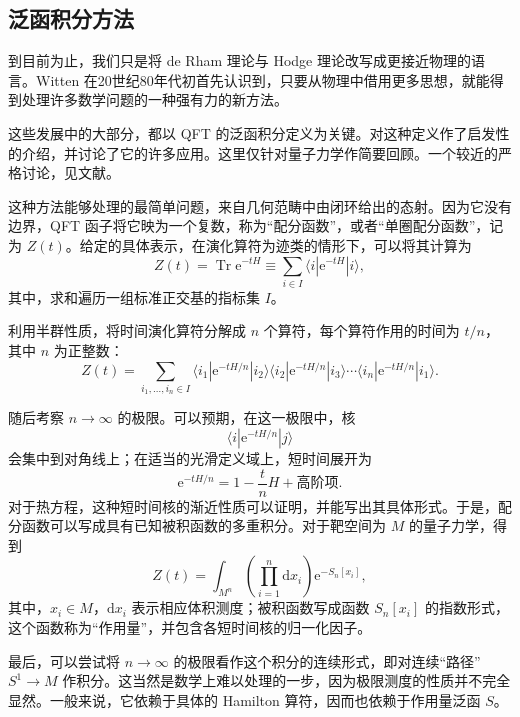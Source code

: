 \subsection{泛函积分方法}\label{sec:3.1.2}

到目前为止，我们只是将 de Rham 理论与 Hodge 理论改写成更接近物理的语言。Witten 在20世纪80年代初首先认识到，只要从物理中借用更多思想，就能得到处理许多数学问题的一种强有力的新方法。

这些发展中的大部分，都以 QFT 的泛函积分定义为关键。对这种定义作了启发性的介绍，并讨论了它的许多应用。这里仅针对量子力学作简要回顾。一个较近的严格讨论，见文献。

这种方法能够处理的最简单问题，来自几何范畴中由闭环给出的态射。因为它没有边界，QFT 函子将它映为一个复数，称为“配分函数”，或者“单圈配分函数”，记为 $Z(t)$。给定的具体表示，在演化算符为迹类的情形下，可以将其计算为
\begin{equation}\label{eq:3.12}
Z(t)=\operatorname{Tr}\mathrm{e}^{-tH}
\equiv\sum_{i\in I}\langle i|\mathrm{e}^{-tH}|i\rangle,
\end{equation}
其中，求和遍历一组标准正交基的指标集 $I$。

利用半群性质，将时间演化算符分解成 $n$ 个算符，每个算符作用的时间为 $t/n$，其中 $n$ 为正整数：
\[
Z(t)=\sum_{i_1,\ldots,i_n\in I}
\langle i_1|\mathrm{e}^{-tH/n}|i_2\rangle
\langle i_2|\mathrm{e}^{-tH/n}|i_3\rangle\cdots
\langle i_n|\mathrm{e}^{-tH/n}|i_1\rangle.
\]

随后考察 $n\to\infty$ 的极限。可以预期，在这一极限中，核
\[
\langle i|\mathrm{e}^{-tH/n}|j\rangle
\]
会集中到对角线上；在适当的光滑定义域上，短时间展开为
\[
\mathrm{e}^{-tH/n}=1-\frac{t}{n}H+\text{高阶项}.
\]
对于热方程，这种短时间核的渐近性质可以证明，并能写出其具体形式。于是，配分函数可以写成具有已知被积函数的多重积分。对于靶空间为 $M$ 的量子力学，得到
\begin{equation}\label{eq:3.13}
Z(t)=\int_{M^n}\left(\prod_{i=1}^n\mathrm{d}x_i\right)
\mathrm{e}^{-S_n[x_i]},
\end{equation}
其中，$x_i\in M$，$\mathrm{d}x_i$ 表示相应体积测度；被积函数写成函数 $S_n[x_i]$ 的指数形式，这个函数称为“作用量”，并包含各短时间核的归一化因子。

最后，可以尝试将 $n\to\infty$ 的极限看作这个积分的连续形式，即对连续“路径” $S^1\to M$ 作积分。这当然是数学上难以处理的一步，因为极限测度的性质并不完全显然。一般来说，它依赖于具体的 Hamilton 算符，因而也依赖于作用量泛函 $S$。


